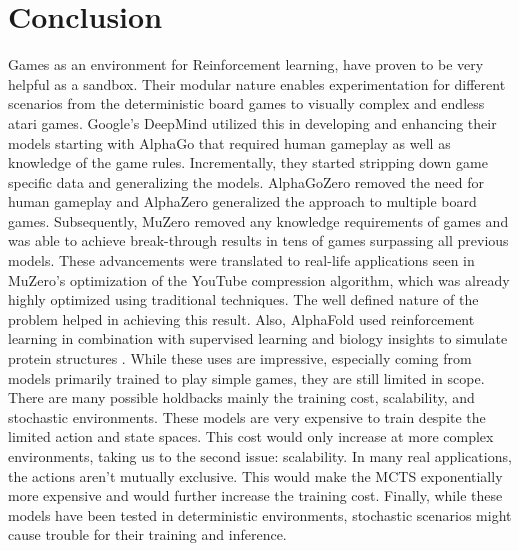 \section*{Conclusion}

Games as an environment for Reinforcement learning, have proven to be very helpful as a sandbox. Their modular nature enables experimentation for different scenarios from the deterministic board games to visually complex and endless atari games. Google’s DeepMind utilized this in developing and enhancing their models starting with AlphaGo that required human gameplay as well as knowledge of the game rules. Incrementally, they started stripping down game specific data and generalizing the models. AlphaGoZero removed the need for human gameplay and AlphaZero generalized the approach to multiple board games. Subsequently, MuZero removed any knowledge requirements of games and was able to achieve break-through results in tens of games surpassing all previous models. These advancements were translated to real-life applications seen in MuZero’s optimization of the YouTube compression algorithm, which was already highly optimized using traditional techniques. The well defined nature of the problem helped in achieving this result. Also, AlphaFold used reinforcement learning in combination with supervised learning and biology insights to simulate protein structures . While these uses are impressive, especially coming from models primarily trained to play simple games, they are still limited in scope. There are many possible holdbacks mainly the training cost, scalability, and stochastic environments. These models are very expensive to train despite the limited action and state spaces. This cost would only increase at more complex environments, taking us to the second issue: scalability. In many real applications, the actions aren’t mutually exclusive. This would make the MCTS exponentially more expensive and would further increase the training cost. Finally, while these models have been tested in deterministic environments, stochastic scenarios might cause trouble for their training and inference.

